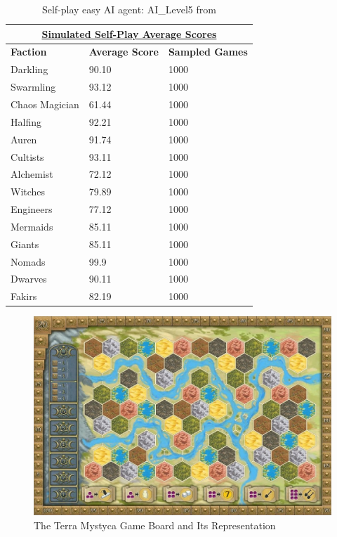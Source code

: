 \documentclass[10pt,twocolumn,letterpaper]{article}
\begin{document}
\begin{table}[h!]
\begin{tabular}{|l|l|l|}
\hline
\multicolumn{3}{|c|}{{\ul \textbf{Simulated Self-Play Average Scores}}}      \\ \hline
\textbf{Faction} & \textbf{Average Score} & \textbf{Sampled Games} \\ \hline
Darkling         & 90.10                 & 1000                   \\ \hline
Swarmling        & 93.12                 & 1000                   \\ \hline
Chaos Magician   & 61.44                 & 1000                   \\ \hline
Halfing          & 92.21                 & 1000                   \\ \hline
Auren            & 91.74                 & 1000                    \\ \hline
Cultists         & 93.11                 & 1000                    \\ \hline
Alchemist        & 72.12                 & 1000                   \\ \hline
Witches          & 79.89                 & 1000                   \\ \hline
Engineers        & 77.12                 & 1000                   \\ \hline
Mermaids         & 85.11                 & 1000                   \\ \hline
Giants           & 85.11                 & 1000                    \\ \hline
Nomads           & 99.9                 & 1000                   \\ \hline
Dwarves          & 90.11                 & 1000                   \\ \hline
Fakirs           & 82.19                 & 1000                    \\ \hline
\end{tabular}
\caption{Self-play easy AI agent: AI\_Level5 from \cite{TMStatsAI}}
\label{table:average_2p_score}
\end{table}

\begin{figure}[h!]
    \centering
    \includegraphics[scale=0.2]{../figures/tm_board}
    \caption{The Terra Mystyca Game Board and Its Representation}
    \label{fig:TM_Board}
\end{figure}
\end{document}
